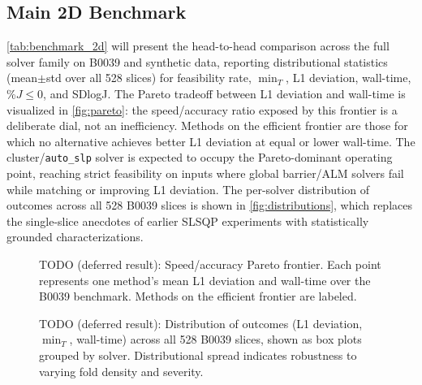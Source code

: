 \subsection{Main 2D Benchmark}
\label{sec:benchmark_2d}

\autoref{tab:benchmark_2d} will present the head-to-head comparison across the full solver family on B0039 and synthetic data, reporting distributional statistics (mean$\pm$std over all 528 slices) for feasibility rate, $\min_T$, L1 deviation, wall-time, \%$J{\leq}0$, and SDlogJ. The Pareto tradeoff between L1 deviation and wall-time is visualized in \autoref{fig:pareto}: the speed/accuracy ratio exposed by this frontier is a deliberate dial, not an inefficiency. Methods on the efficient frontier are those for which no alternative achieves better L1 deviation at equal or lower wall-time. The cluster/\texttt{auto\_slp} solver is expected to occupy the Pareto-dominant operating point, reaching strict feasibility on inputs where global barrier/ALM solvers fail while matching or improving L1 deviation. The per-solver distribution of outcomes across all 528 B0039 slices is shown in \autoref{fig:distributions}, which replaces the single-slice anecdotes of earlier SLSQP experiments with statistically grounded characterizations.

\begin{table}[ht]\centering
\caption{TODO (deferred result): Main 2D benchmark. All methods evaluated on B0039 (528 slices) and the synthetic suite. Columns: geometric feasibility rate, minimum signed area ($\min_T$), L1 deviation, wall-time, \%$J{\leq}0$, and SDlogJ. Statistics are mean$\pm$std over all slices.}
\label{tab:benchmark_2d}
\end{table}

\begin{figure}[ht]\centering
\caption{TODO (deferred result): Speed/accuracy Pareto frontier. Each point represents one method's mean L1 deviation and wall-time over the B0039 benchmark. Methods on the efficient frontier are labeled.}
\label{fig:pareto}
\end{figure}

\begin{figure}[ht]\centering
\caption{TODO (deferred result): Distribution of outcomes (L1 deviation, $\min_T$, wall-time) across all 528 B0039 slices, shown as box plots grouped by solver. Distributional spread indicates robustness to varying fold density and severity.}
\label{fig:distributions}
\end{figure}

